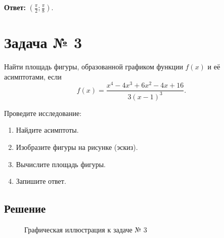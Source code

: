 \documentclass[a4paper,12pt]{article}
\begin{document}
\textbf{Ответ:} \(\left(\frac{\pi}{2}; \frac{\pi}{8}\right)\).

\section{Задача № 3}

Найти площадь фигуры, образованной графиком функции \(f(x)\) и её асимптотами,
если
\[
  f(x) = \frac{x^4 - 4 x^3 + 6 x^2 - 4 x + 16}{3 {(x-1)}^3}.
\]

Проведите исследование:
\begin{enumerate}
\item Найдите асимптоты.
\item Изобразите фигуры на рисунке (эскиз).
\item Вычислите площадь фигуры.
\item Запишите ответ.
\end{enumerate}

\subsection{Решение}

\begin{figure}[htbp]
  \centering
  \caption{Графическая иллюстрация к задаче № 3}\label{fig:3}
\end{figure}
\end{document}
